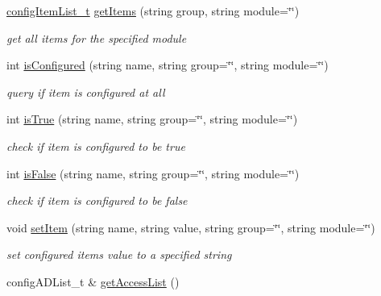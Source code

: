 \begin{DoxyCompactItemize}
\mbox{\label{classConfigManager_acd83de4b0766edde05c4b3f93afedccc}} 
\hyperlink{classconfigItemList__t}{config\+Item\+List\+\_\+t} \hyperlink{classConfigManager_acd83de4b0766edde05c4b3f93afedccc}{get\+Items} (string group, string module=\char`\"{}\char`\"{})
\begin{DoxyCompactList}\small\item\em get all items for the specified module \end{DoxyCompactList}\item 
int \hyperlink{classConfigManager_ae065527722202c0c34d2e775774e27b0}{is\+Configured} (string name, string group=\char`\"{}\char`\"{}, string module=\char`\"{}\char`\"{})
\begin{DoxyCompactList}\small\item\em query if item is configured at all \end{DoxyCompactList}\item 
int \hyperlink{classConfigManager_af39ad88f6a49f537c1660aa186f4f4eb}{is\+True} (string name, string group=\char`\"{}\char`\"{}, string module=\char`\"{}\char`\"{})
\begin{DoxyCompactList}\small\item\em check if item is configured to be true \end{DoxyCompactList}\item 
int \hyperlink{classConfigManager_a217e3864c2c7afe3a340df6405d56a55}{is\+False} (string name, string group=\char`\"{}\char`\"{}, string module=\char`\"{}\char`\"{})
\begin{DoxyCompactList}\small\item\em check if item is configured to be false \end{DoxyCompactList}\item 
void \hyperlink{classConfigManager_a63619a561041c0d5e11c7751b5d999e8}{set\+Item} (string name, string value, string group=\char`\"{}\char`\"{}, string module=\char`\"{}\char`\"{})
\begin{DoxyCompactList}\small\item\em set configured item\textquotesingle{}s value to a specified string \end{DoxyCompactList}\item 
\mbox{\label{classConfigManager_a806bb8edd47dcdd24633a057f5952502}} 
config\+A\+D\+List\+\_\+t \& \hyperlink{classConfigManager_a806bb8edd47dcdd24633a057f5952502}{get\+Access\+List} ()

\end{DoxyCompactItemize}
